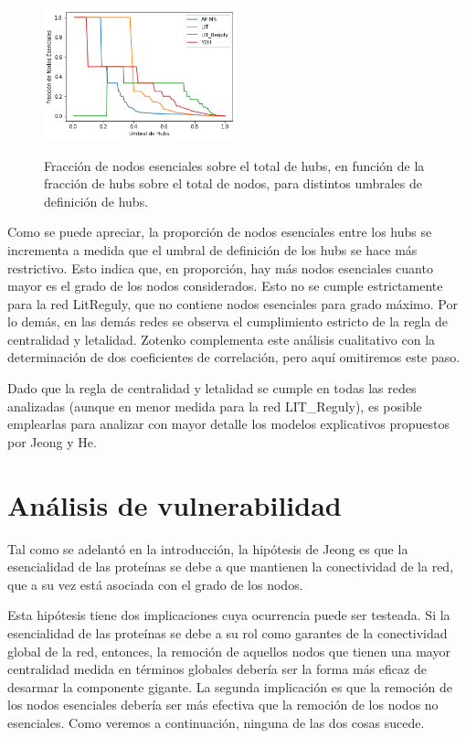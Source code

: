 \documentclass[%
 reprint,
 amsmath,amssymb,
 aps,
]{revtex4-1}
\begin{document}
\begin{figure}
\includegraphics[width=0.5\textwidth]{figura1.png}
\label{figura1}
\caption{Fracci\'on de nodos esenciales sobre el total de hubs, en funci\'on de la fracci\'on de hubs sobre el total de nodos, para distintos umbrales de definici\'on de hubs.}
\end{figure}

Como se puede apreciar, la proporci\'on de nodos esenciales entre los hubs se incrementa a medida que el umbral de definici\'on de los hubs se hace m\'as restrictivo. Esto indica que, en proporci\'on, hay m\'as nodos esenciales cuanto mayor es el grado de los nodos considerados. Esto no se cumple estrictamente para la red LitReguly, que no contiene nodos esenciales para grado m\'aximo. Por lo dem\'as, en las dem\'as redes se observa el cumplimiento estricto de la regla de centralidad y letalidad. Zotenko complementa este an\'alisis cualitativo con la determinaci\'on de dos coeficientes de correlaci\'on, pero aqu\'i omitiremos este paso.

Dado que la regla de centralidad y letalidad se cumple en todas las redes analizadas (aunque en menor medida para la red LIT\_Reguly), es posible emplearlas para analizar con mayor detalle los modelos explicativos propuestos por Jeong y He.


\section{An\'alisis de vulnerabilidad}

Tal como se adelant\'o en la introducci\'on, la hip\'otesis de Jeong es que la esencialidad de las prote\'inas se debe a que mantienen la conectividad de la red, que a su vez est\'a asociada con el grado de los nodos.

Esta hip\'otesis tiene dos implicaciones cuya ocurrencia puede ser testeada. Si la esencialidad de las prote\'inas se debe a su rol como garantes de la conectividad global de la red, entonces, la remoci\'on de aquellos nodos que tienen una mayor centralidad medida en t\'erminos globales deber\'ia ser la forma m\'as eficaz de desarmar la componente gigante. La segunda implicaci\'on es que la remoci\'on de los nodos esenciales deber\'ia ser m\'as efectiva que la remoci\'on de los nodos no esenciales. Como veremos a continuaci\'on, ninguna de las dos cosas sucede. 
\end{document}
